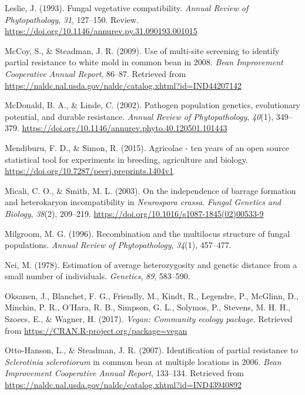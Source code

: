 \hypertarget{ref-leslie1993fungal}{}
Leslie, J. (1993). Fungal vegetative compatibility. \emph{Annual Review
of Phytopathology}, \emph{31}, 127--150. Review.
\url{https://doi.org/10.1146/annurev.py.31.090193.001015}

\hypertarget{ref-mccoy2009use}{}
McCoy, S., \& Steadman, J. R. (2009). Use of multi-site screening to
identify partial resistance to white mold in common bean in 2008.
\emph{Bean Improvement Cooperative Annual Report}, 86--87. Retrieved
from \url{https://naldc.nal.usda.gov/naldc/catalog.xhtml?id=IND44207142}

\hypertarget{ref-mcdonald2002pathogen}{}
McDonald, B. A., \& Linde, C. (2002). Pathogen population genetics,
evolutionary potential, and durable resistance. \emph{Annual Review of
Phytopathology}, \emph{40}(1), 349--379.
\url{https://doi.org/10.1146/annurev.phyto.40.120501.101443}

\hypertarget{ref-mendiburu2015agricolae}{}
Mendiburu, F. D., \& Simon, R. (2015). Agricolae - ten years of an open
source statistical tool for experiments in breeding, agriculture and
biology. \url{https://doi.org/10.7287/peerj.preprints.1404v1}

\hypertarget{ref-micali2003independence}{}
Micali, C. O., \& Smith, M. L. (2003). On the independence of barrage
formation and heterokaryon incompatibility in \emph{Neurospora crassa}.
\emph{Fungal Genetics and Biology}, \emph{38}(2), 209--219.
\url{https://doi.org/10.1016/s1087-1845(02)00533-9}

\hypertarget{ref-milgroom1996recombination}{}
Milgroom, M. G. (1996). Recombination and the multilocus structure of
fungal populations. \emph{Annual Review of Phytopathology},
\emph{34}(1), 457--477.

\hypertarget{ref-nei1978estimation}{}
Nei, M. (1978). Estimation of average heterozygosity and genetic
distance from a small number of individuals. \emph{Genetics}, \emph{89},
583--590.

\hypertarget{ref-vegan}{}
Oksanen, J., Blanchet, F. G., Friendly, M., Kindt, R., Legendre, P.,
McGlinn, D., Minchin, P. R., O'Hara, R. B., Simpson, G. L., Solymos, P.,
Stevens, M. H. H., Szoecs, E., \& Wagner, H. (2017). \emph{Vegan:
Community ecology package}. Retrieved from
\url{https://CRAN.R-project.org/package=vegan}

\hypertarget{ref-otto2007identification}{}
Otto-Hanson, L., \& Steadman, J. R. (2007). Identification of partial
resistance to \emph{Sclerotinia sclerotiorum} in common bean at multiple
locations in 2006. \emph{Bean Improvement Cooperative Annual Report},
133--134. Retrieved from
\url{https://naldc.nal.usda.gov/naldc/catalog.xhtml?id=IND43940892}

